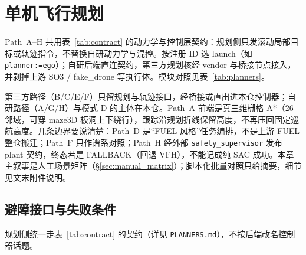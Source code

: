 \chapter{单机飞行规划}

Path~A--H 共用表~\ref{tab:contract} 的动力学与控制层契约：规划侧只发滚动局部目标或轨迹指令，不替换自研动力学与混控。按注册 ID 选 launch（如 \texttt{planner:=ego}）；自研后端直连契约，第三方规划核经 vendor 与桥接节点接入，并剥掉上游 SO3 / fake\_drone 等执行体。模块对照见表~\ref{tab:planners}。


第三方路径（B/C/E/F）只留规划与轨迹接口，经桥接或直出进本仓控制器；自研路径（A/G/H）与模式 D 的主体在本仓。Path~A 前端是真三维栅格 A*（26 邻域，可穿 maze3D 板洞上下绕行），跟踪沿规划折线保留高度，不再压回固定巡航高度。几条边界要说清楚：Path~D 是“FUEL 风格”任务编排，不是上游 FUEL 整仓搬迁；Path~F 只作谱系对照；Path~H 经外部 \texttt{safety\_supervisor} 发布 plant 契约，终态若是 FALLBACK（回退 VFH），不能记成纯 SAC 成功。本章主叙事是人工场景矩阵（\S\ref{sec:manual_matrix}）；脚本化批量对照只给摘要，细节见文末附件说明。

\section{避障接口与失败条件}

规划侧统一走表~\ref{tab:contract} 的契约（详见 \texttt{PLANNERS.md}），不按后端改名控制器话题。

